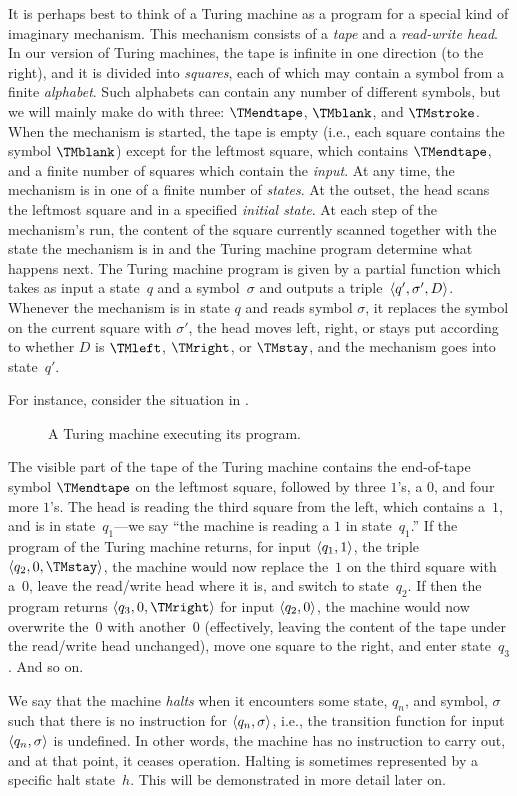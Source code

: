 \documentclass[../../../include/open-logic-section]{subfiles}
\begin{document}
\begin{explain}
It is perhaps best to think of a Turing
machine as a program for a special kind of imaginary mechanism. This
mechanism consists of a \emph{tape} and a \emph{read-write head}. In
our version of Turing machines, the tape is infinite in one direction
(to the right), and it is divided into \emph{squares}, each of which
may contain a symbol from a finite \emph{alphabet}. Such alphabets can
contain any number of different symbols, but we will mainly make do
with three: $\TMendtape$, $\TMblank$, and $\TMstroke$. When the
mechanism is started, the tape is empty (i.e., each square contains
the symbol $\TMblank$) except for the leftmost square, which contains
$\TMendtape$, and a finite number of squares which contain the
\emph{input}. At any time, the mechanism is in one of a finite number
of \emph{states}. At the outset, the head scans the leftmost square
and in a specified \emph{initial state}. At each step of the
mechanism's run, the content of the square currently scanned together
with the state the mechanism is in and the Turing machine program
determine what happens next. The Turing machine program is given by a
partial function which takes as input a state~$q$ and a
symbol~$\sigma$ and outputs a triple~$\langle q', \sigma',
  D \rangle$. Whenever the mechanism is in state $q$ and reads symbol
$\sigma$, it replaces the symbol on the current square with $\sigma'$,
the head moves left, right, or stays put according to whether $D$ is
$\TMleft$, $\TMright$, or $\TMstay$, and the mechanism goes into
state~$q'$.

For instance, consider the situation in .
\begin{figure}
  \caption{A Turing machine executing its program.}
\end{figure}
The visible part of the tape of the Turing machine contains the
end-of-tape symbol $\TMendtape$ on the leftmost square, followed by
three $1$'s, a $0$, and four more $1$'s.  The
head is reading the third square from the left, which contains
a~$1$, and is in state~$q_1$---we say ``the machine is reading
a $1$ in state~$q_1$.'' If the program of the Turing machine
returns, for input $\langle q_1, 1 \rangle$, the triple $\tuple{q_2,
0, \TMstay}$, the machine would now replace the~$1$ on
the third square with a~$0$, leave the read/write head where it
is, and switch to state~$q_2$.  If then the program returns
$\tuple{q_3, 0, \TMright}$ for input $\langle q_2, 0 \rangle$,
the machine would now overwrite the~$0$ with another~$0$
(effectively, leaving the content of the tape under the read/write
head unchanged), move one square to the right, and enter state~$q_3$.
And so on.

We say that the machine \emph{halts} when it encounters some state,
$q_n$, and symbol, $\sigma$ such that there is no instruction for
$\langle q_n, \sigma \rangle$, i.e., the transition function for input
$\langle q_n,\sigma \rangle$ is undefined. In other words, the machine has no
instruction to carry out, and at that point, it ceases
operation. Halting is sometimes represented by a specific halt
state~$h$.  This will be demonstrated in more detail later on.
\end{explain}
\end{document}
